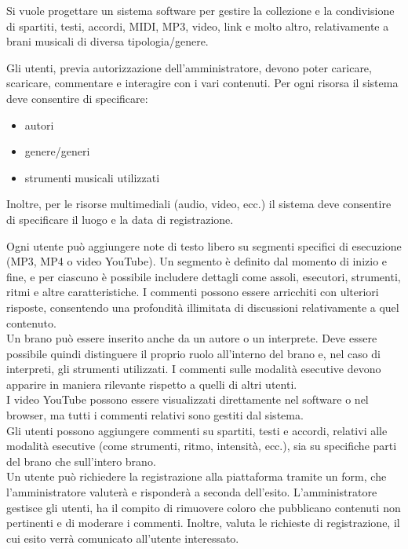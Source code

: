 \documentclass[a4paper]{article}
\begin{document}
Si vuole progettare un sistema software per gestire la collezione e la condivisione 
di spartiti, testi, accordi, MIDI, MP3, video, link e molto altro, relativamente a brani 
musicali di diversa tipologia/genere.

\skip

Gli utenti, previa autorizzazione dell'amministratore, devono poter caricare, 
scaricare, commentare e interagire con i vari contenuti. Per ogni risorsa il sistema deve
consentire di specificare:
\begin{itemize}
    \item autori
    \item genere/generi
    \item strumenti musicali utilizzati
\end{itemize}

Inoltre, per le risorse multimediali (audio, video, ecc.) il sistema deve
consentire di specificare il luogo e la data di registrazione.

Ogni utente può aggiungere note di testo libero su segmenti specifici di esecuzione (MP3, MP4 o video YouTube).  
Un segmento è definito dal momento di inizio e fine, e per ciascuno è possibile includere dettagli come assoli, esecutori, strumenti,
ritmi e altre caratteristiche. I commenti possono essere arricchiti con ulteriori 
risposte, consentendo una profondità illimitata di discussioni relativamente a quel 
contenuto.\\[2ex]

Un brano può essere inserito anche da un autore o un interprete. Deve essere possibile 
quindi distinguere il proprio ruolo all’interno del brano e, nel caso di interpreti, 
gli strumenti utilizzati. I commenti sulle modalità esecutive devono apparire in maniera 
rilevante rispetto a quelli di altri utenti.\\[2ex]

I video YouTube possono essere visualizzati direttamente nel software o nel browser, 
ma tutti i commenti relativi sono gestiti dal sistema.\\[2ex]

Gli utenti possono aggiungere commenti su spartiti, testi e accordi, 
relativi alle modalità esecutive (come strumenti, ritmo, intensità, ecc.), sia su 
specifiche parti del brano che sull'intero brano.\\[2ex]

Un utente può richiedere la registrazione alla piattaforma tramite un form, che 
l'amministratore valuterà e risponderà a seconda dell’esito.  
L'amministratore gestisce gli utenti, ha il compito di rimuovere coloro che pubblicano contenuti non pertinenti 
e di moderare i commenti. Inoltre, valuta le richieste di registrazione, il cui esito verrà comunicato 
all’utente interessato.\\[2ex]
\end{document}
